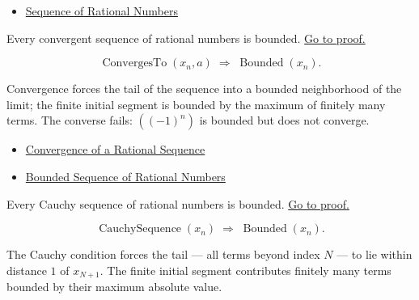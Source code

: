 \begin{dependencies}
\begin{itemize}
  \item \hyperref[def:rational-sequence]{Sequence of Rational Numbers}
\end{itemize}
\end{dependencies}

\begin{theorem}
\label{thm:convergent-bounded-q}
Every convergent sequence of rational numbers is bounded.
\hyperref[prf:convergent-bounded-q]{Go to proof.}
\end{theorem}

\begin{remark*}
\[
\operatorname{ConvergesTo}(x_n, a)
\;\Longrightarrow\;
\operatorname{Bounded}(x_n).
\]
\end{remark*}

\begin{remark*}[Interpretation]
Convergence forces the tail of the sequence into a bounded neighborhood of
the limit; the finite initial segment is bounded by the maximum of finitely
many terms. The converse fails: $((-1)^n)$ is bounded but does not converge.
\end{remark*}

\begin{dependencies}
\begin{itemize}
  \item \hyperref[def:convergent-rational-sequence]{Convergence of a Rational Sequence}
  \item \hyperref[def:bounded-sequence-q]{Bounded Sequence of Rational Numbers}
\end{itemize}
\end{dependencies}

\begin{theorem}
\label{thm:cauchy-bounded-q}
Every Cauchy sequence of rational numbers is bounded.
\hyperref[prf:cauchy-bounded-q]{Go to proof.}
\end{theorem}

\begin{remark*}
\[
\operatorname{CauchySequence}(x_n)
\;\Longrightarrow\;
\operatorname{Bounded}(x_n).
\]
\end{remark*}

\begin{remark*}[Interpretation]
The Cauchy condition forces the tail --- all terms beyond index $N$ --- to
lie within distance $1$ of $x_{N+1}$. The finite initial segment contributes
finitely many terms bounded by their maximum absolute value.
\end{remark*}

